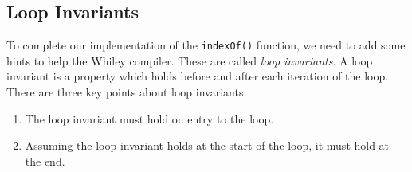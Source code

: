 \subsection{Loop Invariants}

To complete our implementation of the \lstinline{indexOf()} function,
we need to add some hints to help the Whiley compiler.  These are
called {\em loop invariants}.  A loop invariant is a property which
holds before and after each iteration of the loop.  There are three
key points about loop invariants:
\begin{enumerate}
\item The loop invariant must hold on entry to the loop.
\item Assuming the loop invariant holds at the start of the loop, it
  must hold at the end.
\end{enumerate}